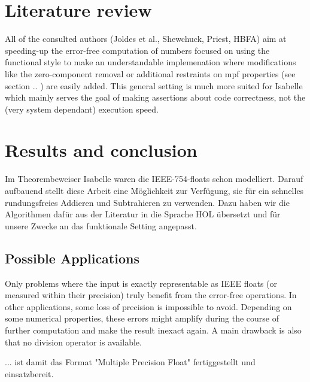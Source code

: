 \documentclass[11pt,a4paper]{article}
\begin{document}
\section{Literature review}

All of the consulted authors (Joldes et al., Shewchuck, Priest, HBFA) aim at speeding-up the error-free computation of numbers
focused on using the functional style to make an understandable implemenation where modifications like the zero-component removal or additional restraints on mpf properties (see section .. ) are easily added.
This general setting is much more suited for Isabelle which mainly serves the goal of making assertions about code correctness, not the (very system dependant) execution speed.


\section{Results and conclusion}

Im Theorembeweiser Isabelle waren die IEEE-754-floats schon modelliert. Darauf aufbauend stellt diese Arbeit eine Möglichkeit zur Verfügung, sie für ein schnelles rundungsfreies Addieren und Subtrahieren zu verwenden. Dazu haben wir die Algorithmen dafür aus der Literatur in die Sprache HOL übersetzt und für unsere Zwecke an das funktionale Setting angepasst.

\subsection{Possible Applications}
Only problems where the input is exactly representable as IEEE floats (or measured within their precision) truly benefit from the error-free
operations. In other applications, some loss of precision is impossible to avoid. Depending on some numerical properties, these errors might amplify during the course of further computation and make the result inexact again. A main drawback is also that no division operator is available.


... ist damit das Format "Multiple Precision Float" fertiggestellt und einsatzbereit.

%
%
\end{document}

